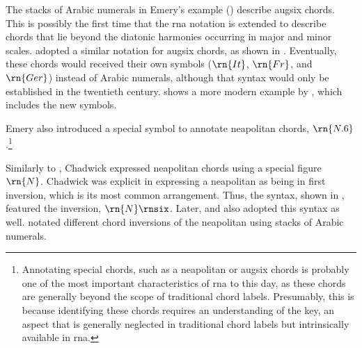 


The stacks of Arabic numerals in Emery's example
() describe
\gls{augsix} chords. This is possibly the first time that
the \gls{rna} notation is extended to describe chords that
lie beyond the diatonic harmonies occurring in major and
minor scales. \textcite{shepard1896harmony} adopted a
similar notation for \gls{augsix} chords, as shown in
. Eventually,
these chords would received their own symbols ($\rn{It}$,
$\rn{Fr}$, and $\rn{Ger}$) instead of Arabic numerals,
although that syntax would only be established in the
twentieth century.
 shows a more
modern example by \textcite{goldman1965harmony}, which
includes the new symbols.



Emery also introduced a special symbol to annotate
\gls{neapolitan} chords, $\rn{N.6}$.\footnote{Annotating
special chords, such as a \gls{neapolitan} or \gls{augsix}
chords is probably one of the most important characteristics
of \gls{rna} to this day, as these chords are generally
beyond the scope of traditional chord labels. Presumably,
this is because identifying these chords requires an
understanding of the key, an aspect that is generally
neglected in traditional chord labels but intrinsically
available in \gls{rna}.}

Similarly to \textcite{emery1879elements}, Chadwick
expressed \gls{neapolitan} chords using a special figure
$\rn{N}$. Chadwick was explicit in expressing a
\gls{neapolitan} as being in first inversion, which is its
most common arrangement. Thus, the syntax, shown in
, featured
the inversion, $\rn{N}\rnsix$. Later,
\textcite{heacox1907lessons} and
\textcite{alchin1921applied} also adopted this syntax as
well. \textcite{heacox1907lessons} notated different chord
inversions of the \gls{neapolitan} using stacks of Arabic
numerals.

